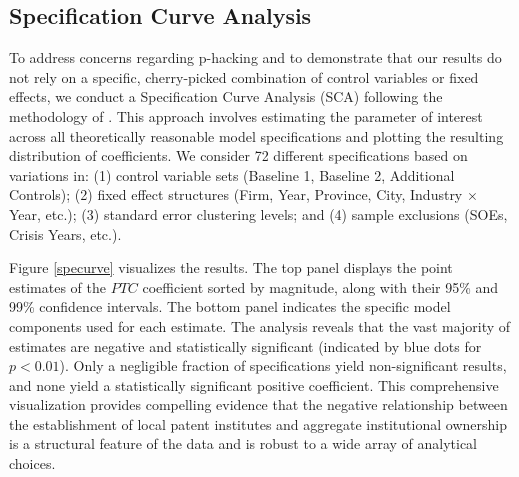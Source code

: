 \documentclass[12pt,a4paper]{article}
\begin{document}
\subsection{Specification Curve Analysis}
To address concerns regarding p-hacking and to demonstrate that our results do not rely on a specific, cherry-picked combination of control variables or fixed effects, we conduct a Specification Curve Analysis (SCA) following the methodology of \cite{simonsohn2020specification}. This approach involves estimating the parameter of interest across all theoretically reasonable model specifications and plotting the resulting distribution of coefficients. We consider 72 different specifications based on variations in: (1) control variable sets (Baseline 1, Baseline 2, Additional Controls); (2) fixed effect structures (Firm, Year, Province, City, Industry $\times$ Year, etc.); (3) standard error clustering levels; and (4) sample exclusions (SOEs, Crisis Years, etc.).

Figure \ref{specurve} visualizes the results. The top panel displays the point estimates of the $PTC$ coefficient sorted by magnitude, along with their 95\% and 99\% confidence intervals. The bottom panel indicates the specific model components used for each estimate. The analysis reveals that the vast majority of estimates are negative and statistically significant (indicated by blue dots for $p < 0.01$). Only a negligible fraction of specifications yield non-significant results, and none yield a statistically significant positive coefficient. This comprehensive visualization provides compelling evidence that the negative relationship between the establishment of local patent institutes and aggregate institutional ownership is a structural feature of the data and is robust to a wide array of analytical choices.
\end{document}
